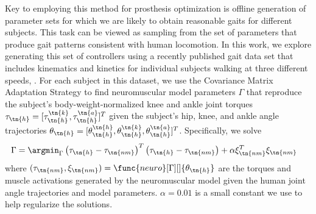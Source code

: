 Key to employing this method for prosthesis optimization is offline generation
of parameter sets for which we are likely to obtain reasonable gaits for
different subjects. This task can be viewed as sampling from the set of
parameters that produce gait patterns consistent with human locomotion. In this
work, we explore generating this set of controllers using a recently published
gait data set that includes kinematics and kinetics for individual subjects
walking at three different speeds, 
\citep{moore2015elaborate}.  For each subject in this dataset, we use the
Covariance Matrix Adaptation Strategy \citep{hansen2006cma} to find
neuromuscular model parameters $\Gamma$ that reproduce the subject's
body-weight-normalized knee and ankle joint torques $\tau_\tn{h} =
[\tau_\tn{h}^\tn{k},\tau_\tn{h}^\tn{a}]^T$ given the subject's hip, knee, and
ankle angle trajectories $\theta_\tn{h} =
[\theta_\tn{h}^\tn{h},\theta_\tn{h}^\tn{k},\theta_\tn{h}^\tn{a}]^T$.
Specifically, we solve
\begin{align}
    \Gamma &= \argmin_\Gamma \left(\tau_\tn{h} - \tau_\tn{nm} \right)^T
    \left(\tau_\tn{h} - \tau_\tn{nm} \right) + \alpha \xi_\tn{nm}^T \xi_\tn{nm}
\end{align}
where $(\tau_\tn{nm}, \xi_\tn{nm}) = \func{neuro}[\Gamma][]{\theta_\tn{h}}$ are
the torques and muscle activations generated by the neuromuscular model given
the human joint angle trajectories and model parameters. $\alpha = 0.01$ is a
small constant we use to help regularize the solutions.


